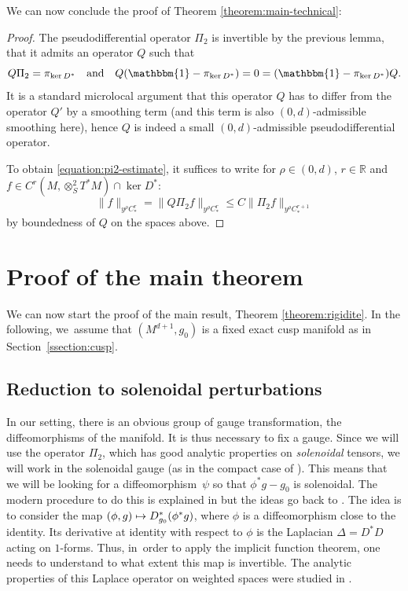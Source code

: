 \documentclass[JEP,XML,SOM,Unicode,NoFloatCountersInSection]{cedram}
\newcommand\mto{\mathchoice{\longmapsto}{\mapsto}{\mapsto}{\mapsto}}
\newcommand{\quand}{\quad\text{and}\quad}
\newcommand{\R}{\mathbb{R}}
\theoremstyle{plain}
\theoremstyle{definition}
\begin{document}
We can now conclude the proof of Theorem \ref{theorem:main-technical}:

\begin{proof}
The pseudodifferential operator $\Pi_2$ is invertible by the previous lemma, that it admits an operator $Q$ such that
\[
Q\Pi_2 = \pi_{\ker D^*}\quand Q(\mathbbm{1}-\pi_{\ker D^*})=0 =(\mathbbm{1}-\pi_{\ker D^*})Q. 
\]
It is a standard microlocal argument that this operator $Q$ has to differ from the operator $Q'$ by a smoothing term (and this term is also $(0,d)$-admissible smoothing here), hence $Q$ is indeed a small $(0,d)$-admissible pseudodifferential operator.

To obtain \eqref{equation:pi2-estimate}, it suffices to write for $\rho \in (0,d)$, $r \in \R$ and $f \in C^r(M,\otimes^2_S T^*M) \cap \ker D^*$:
\[
\|f\|_{y^\rho C^r_*} = \|Q\Pi_2f\|_{y^\rho C^r_*} \leq C\|\Pi_2 f\|_{y^\rho C^{r+1}_*}
\]
by boundedness of $Q$ on the spaces above.
\end{proof}

\section{Proof of the main theorem}

We can now start the proof of the main result, Theorem \ref{theorem:rigidite}. In the following, we~assume that $(M^{d+1},g_0)$ is a fixed exact cusp manifold as in Section~\ref{ssection:cusp}.

\label{section:end}

\subsection{Reduction to solenoidal perturbations}

\label{ssection:reduction}

In our setting, there is an obvious group of gauge transformation, the diffeomorphisms of the manifold. It is thus necessary to fix a gauge. Since we will use the operator $\Pi_2$, which has good analytic properties on \emph{solenoidal} tensors, we will work in the solenoidal gauge (as in the compact case of \cite{Guillarmou-Lefeuvre-18}). This means that we will be looking for a diffeomorphism~$\psi$ so that $\phi^\ast g - g_0$ is solenoidal. The modern procedure to do this is explained in \cite[Lem.\,4.1]{Guillarmou-Lefeuvre-18} but the ideas go back to \cite{Ebin-68}. The idea is to consider the map $(\phi,g) \mto D^\ast_{g_0}(\phi^\ast g)$, where $\phi$ is a diffeomorphism close to the identity. Its derivative at {\color{black}identity} with respect to $\phi$ is the Laplacian $\Delta = D^\ast D$ acting on $1$-forms. Thus, in~order to apply the implicit function theorem, one needs to understand to what extent this map is invertible. The analytic properties of this Laplace operator on weighted spaces were studied in \cite[Lem.\,5.4]{Bonthonneau-Lefeuvre-19-1}.
\end{document}
